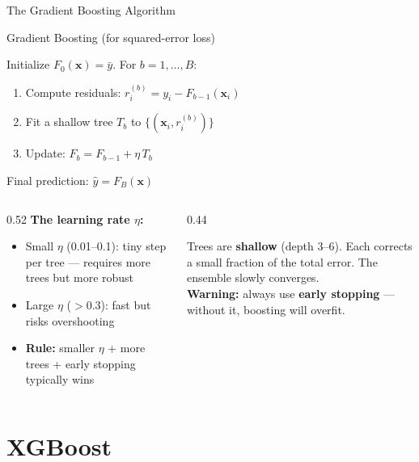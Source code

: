 \documentclass[aspectratio=169, 11pt]{beamer}
\begin{document}
\begin{frame}{The Gradient Boosting Algorithm}
  \begin{definitionbox}{Gradient Boosting (for squared-error loss)}
    {\footnotesize
    Initialize $F_0(\mathbf{x}) = \bar{y}$. For $b = 1, \ldots, B$:
    \begin{enumerate}\itemsep0pt
      \item Compute residuals: $r_i^{(b)} = y_i - F_{b-1}(\mathbf{x}_i)$
      \item Fit a shallow tree $T_b$ to $\{(\mathbf{x}_i, r_i^{(b)})\}$
      \item Update: $F_b = F_{b-1} + \eta\, T_b$
    \end{enumerate}
    Final prediction: $\hat{y} = F_B(\mathbf{x})$
    }
  \end{definitionbox}
  \vspace{-0.2cm}
  \begin{columns}[T]
    \begin{column}{0.52\textwidth}
      \textbf{The learning rate $\eta$:}
      \begin{itemize}\footnotesize\itemsep0pt
        \item Small $\eta$ (0.01--0.1): tiny step per tree ---
              requires more trees but more robust
        \item Large $\eta$ ($> 0.3$): fast but risks overshooting
        \item \textbf{Rule:} smaller $\eta$ + more trees + early stopping
              typically wins
      \end{itemize}
    \end{column}
    \begin{column}{0.44\textwidth}
      \begin{keybox}
        \footnotesize Trees are \textbf{shallow} (depth 3--6).
        Each corrects a small fraction of the total error.
        The ensemble slowly converges.\\[2pt]
        \textbf{Warning:} always use \textbf{early stopping} ---
        without it, boosting will overfit.
      \end{keybox}
    \end{column}
  \end{columns}
\end{frame}

\section{XGBoost}
\end{document}
